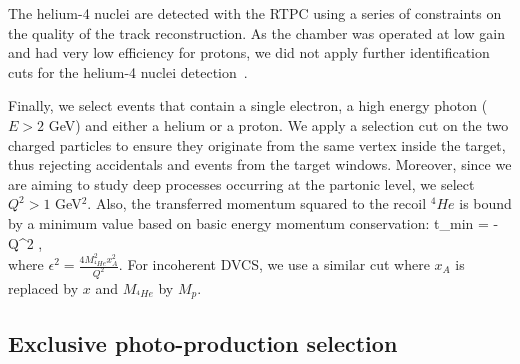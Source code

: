 \documentclass{article}
\let\oldequation\equation
\let\oldendequation\endequation
\renewenvironment{equation}
  {\linenomathNonumbers\oldequation}
  {\oldendequation\endlinenomath}
\begin{document}
The helium-4 nuclei are detected with the RTPC using a series of constraints on the quality
of the track reconstruction. As the chamber was operated at low gain and had very low efficiency 
for protons, we did not apply further identification cuts for the helium-4 nuclei 
detection~\cite{Dupre:2017upj}.

Finally, we select events that contain a single electron, a high energy photon ($E>2$ GeV) and
either a helium or a proton. We apply a selection cut on the two charged particles 
to ensure they originate from the same vertex inside the target, thus rejecting accidentals and
events from the target windows.
Moreover, since we are aiming to study deep processes occurring at the partonic level, we select
$Q^2>1$ GeV$^2$. Also, the transferred momentum squared to the recoil $^{4}He$ is bound by
   a minimum value based on basic energy momentum conservation:
\begin{equation}
   t_{min} = - Q^{2} ,\\
\end{equation}
where $\epsilon ^{2} = \frac{4M^{2}_{^4\!He}x^{2}_{A}}{Q^{2}}$. For incoherent DVCS, 
we use a similar cut where $x_A$ is replaced by $x$ and $M_{^4\!He}$ by $M_{p}$. 

\subsection{Exclusive photo-production selection}
\end{document}
